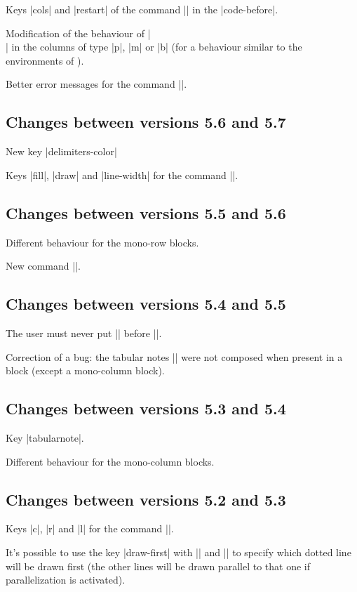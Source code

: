 \documentclass[dvipsnames]{article}%
\begin{document}
Keys |cols| and |restart| of the command |\rowcolors| in the |code-before|.

Modification of the behaviour of |\\| in the columns of type |p|, |m| or |b|
(for a behaviour similar to the environments of ).

Better error messages for the command |\Block|.

\subsection*{Changes between versions 5.6 and 5.7}

New key |delimiters-color|

Keys |fill|, |draw| and |line-width| for the command |\Block|.

\subsection*{Changes between versions 5.5 and 5.6}

Different behaviour for the mono-row blocks.

New command |\NotEmpty|.

\subsection*{Changes between versions 5.4 and 5.5}

The user must never put |\omit| before |\CodeAfter|.

Correction of a bug: the tabular notes |\tabularnotes| were not composed when
present in a block (except a mono-column block).

\subsection*{Changes between versions 5.3 and 5.4}

Key |tabularnote|.

Different behaviour for the mono-column blocks.

\subsection*{Changes between versions 5.2 and 5.3}

Keys |c|, |r| and |l| for the command |\Block|.

It's possible to use the key |draw-first| with |\Ddots| and |\Iddots| to
specify which dotted line will be drawn first (the other lines will be drawn
parallel to that one if parallelization is activated).
\end{document}
